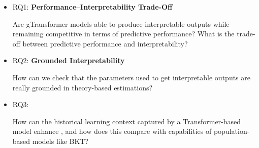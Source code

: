\documentclass[applsci,article,submit,moreauthors,pdftex]{Definitions/mdpi}
\begin{document}
\begin{itemize}
\item RQ1: \textbf{Performance--Interpretability Trade-Off}

Are gTransformer models able to produce interpretable outputs while remaining competitive in terms of predictive performance? What is the trade-off between predictive performance and interpretability?

\item RQ2: \textbf{Grounded Interpretability}

How can we check that the parameters used to get interpretable outputs are really grounded in theory-based estimations?  

\item RQ3: 

How can the historical learning context captured by a Transformer-based model enhance , and how does this compare with capabilities of population-based models like BKT?

\end{itemize}
\end{document}
